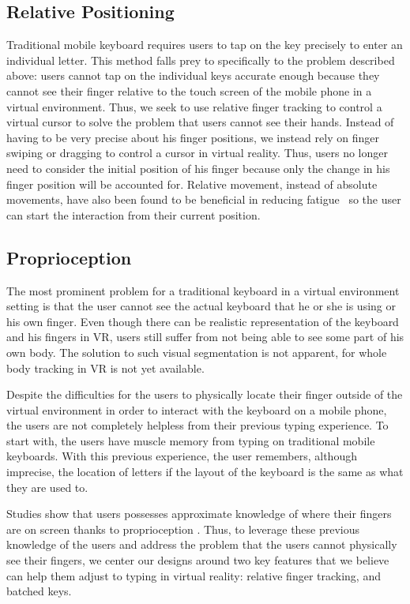 \subsection{Relative Positioning}
Traditional mobile keyboard requires users to tap on the key precisely to enter an individual letter.
This method falls prey to specifically to the problem described above: users cannot tap on the individual keys accurate enough because they cannot see their finger relative to the touch screen of the mobile phone in a virtual environment.
Thus, we seek to use relative finger tracking to control a virtual cursor to solve the problem that users cannot see their hands.
Instead of having to be very precise about his finger positions, we instead rely on finger swiping or dragging to control a cursor in virtual reality.
Thus, users no longer need to consider the initial position of his finger because only the change in his finger position will be accounted for. 
Relative movement, instead of absolute movements, have also been found to be beneficial in reducing fatigue~\cite{Hincapie-Ramos:2014:CEM:2556288.2557130} so the user can start the interaction from their current position.

\subsection{Proprioception}
The most prominent problem for a traditional keyboard in a virtual environment setting is that the user cannot see the actual keyboard that he or she is using or his own finger.
Even though there can be realistic representation of the keyboard and his fingers in VR, users still suffer from not being able to see some part of his own body.
The solution to such visual segmentation is not apparent, for whole body tracking in VR is not yet available.

Despite the difficulties for the users to physically locate their finger outside of the virtual environment in order to interact with the keyboard on a mobile phone, the users are not completely helpless from their previous typing experience.
To start with, the users have muscle memory from typing on traditional mobile keyboards. With this previous experience, the user remembers, although imprecise, the location of letters if the layout of the keyboard is the same as what they are used to.

Studies show that users possesses approximate knowledge of where their fingers are on screen thanks to proprioception \cite{boff1986handbook}.
Thus, to leverage these previous knowledge of the users and address the problem that the users cannot physically see their fingers, we center our designs around two key features that we believe can help them adjust to typing in virtual reality: relative finger tracking, and batched keys.

